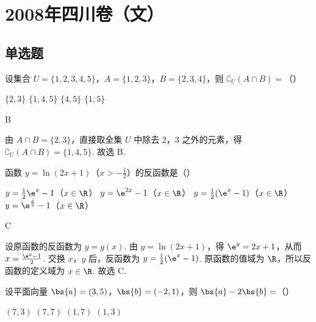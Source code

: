 \chapter{2008年四川卷（文）}

\section{单选题}

\begin{problem}
设集合 \(U = \{1, 2, 3, 4, 5\}\)，\(A = \{1, 2, 3\}\)，\(B = \{2, 3, 4\}\)，则 \(\complement_U(A \cap B) =\)（\quad）

\choices
    {\(\{2, 3\}\)}
    {\(\{1, 4, 5\}\)}
    {\(\{4, 5\}\)}
    {\(\{1, 5\}\)}
\end{problem}

\begin{answer}
B
\end{answer}

\begin{solution}
由 \(A\cap B=\{2,3\}\)，直接取全集 \(U\) 中除去 \(2\)，\(3\) 之外的元素，得 \(\complement_U(A\cap B)=\{1,4,5\}\). 故选 B.
\end{solution}

\begin{problem}
函数 \(y = \ln(2x + 1)\)（\(x > -\frac{1}{2}\)）的反函数是（\quad）

\choices
    {\(y = \frac{1}{2}\e^{x} - 1\)（\(x \in \R\)）}
    {\(y = \e^{2x} - 1\)（\(x \in \R\)）}
    {\(y = \frac{1}{2}(\e^{x} - 1)\)（\(x \in \R\)）}
    {\(y = \e^{\frac{x}{2}} - 1\)（\(x \in \R\)）}
\end{problem}

\begin{answer}
C
\end{answer}

\begin{solution}
设原函数的反函数为 \(y=g(x)\). 由 \(y=\ln(2x+1)\)，得 \(\e^{y}=2x+1\)，从而 \(x=\frac{\e^{y}-1}{2}\). 交换 \(x\)，\(y\) 后，反函数为 \(y=\frac{1}{2}(\e^{x}-1)\). 原函数的值域为 \(\R\)，所以反函数的定义域为 \(x\in\R\). 故选 C.
\end{solution}

\begin{problem}
设平面向量 \(\bs{a} = (3, 5)\)，\(\bs{b} = (-2, 1)\)，则 \(\bs{a} - 2\bs{b} =\)（\quad）

\choices
    {\((7, 3)\)}
    {\((7, 7)\)}
    {\((1, 7)\)}
    {\((1, 3)\)}
\end{problem}

